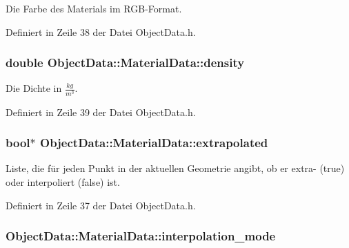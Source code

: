 Die Farbe des Materials im R\-G\-B-\/\-Format. 



Definiert in Zeile 38 der Datei Object\-Data.\-h.

\hypertarget{structObjectData_1_1MaterialData_a49cbca11f42993f41497e725fe8ca68c}{
\subsubsection[{density}]{\setlength{\rightskip}{0pt plus 5cm}double Object\-Data\-::\-Material\-Data\-::density}}\label{structObjectData_1_1MaterialData_a49cbca11f42993f41497e725fe8ca68c}


Die Dichte in $\frac{kg}{m^3}$. 



Definiert in Zeile 39 der Datei Object\-Data.\-h.

\hypertarget{structObjectData_1_1MaterialData_a22bff8a90f617a5485690bd017dcf701}{
\subsubsection[{extrapolated}]{\setlength{\rightskip}{0pt plus 5cm}bool$\ast$ Object\-Data\-::\-Material\-Data\-::extrapolated}}\label{structObjectData_1_1MaterialData_a22bff8a90f617a5485690bd017dcf701}


Liste, die für jeden Punkt in der aktuellen Geometrie angibt, ob er extra-\/ (true) oder interpoliert (false) ist. 



Definiert in Zeile 37 der Datei Object\-Data.\-h.

\hypertarget{structObjectData_1_1MaterialData_a35d4f03b3af4349f69d5fed072118dca}{
\subsubsection[{interpolation\-\_\-mode}]{ Object\-Data\-::\-Material\-Data\-::interpolation\-\_\-mode}}\label{structObjectData_1_1MaterialData_a35d4f03b3af4349f69d5fed072118dca}


